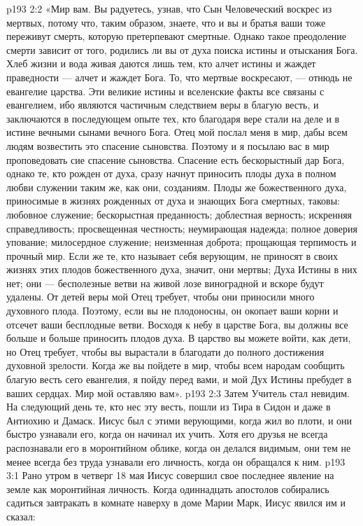 \vs p193 2:2 \pc «Мир вам. Вы радуетесь, узнав, что Сын Человеческий воскрес из мертвых, потому что, таким образом, знаете, что и вы и братья ваши тоже переживут смерть, которую претерпевают смертные. Однако такое преодоление смерти зависит от того, родились ли вы от духа поиска истины и отыскания Бога. Хлеб жизни и вода живая даются лишь тем, кто алчет истины и жаждет праведности --- алчет и жаждет Бога. То, что мертвые воскресают, --- отнюдь не евангелие царства. Эти великие истины и вселенские факты все связаны с евангелием, ибо являются частичным следствием веры в благую весть, и заключаются в последующем опыте тех, кто благодаря вере стали на деле и в истине вечными сынами вечного Бога. Отец мой послал меня в мир, дабы всем людям возвестить это спасение сыновства. Поэтому и я посылаю вас в мир проповедовать сие спасение сыновства. Спасение есть бескорыстный дар Бога, однако те, кто рожден от духа, сразу начнут приносить плоды духа в полном любви служении таким же, как они, созданиям. Плоды же божественного духа, приносимые в жизнях рожденных от духа и знающих Бога смертных, таковы: любовное служение; бескорыстная преданность; доблестная верность; искренняя справедливость; просвещенная честность; неумирающая надежда; полное доверия упование; милосердное служение; неизменная доброта; прощающая терпимость и прочный мир. Если же те, кто называет себя верующим, не приносят в своих жизнях этих плодов божественного духа, значит, они мертвы; Духа Истины в них нет; они --- бесполезные ветви на живой лозе виноградной и вскоре будут удалены. От детей веры мой Отец требует, чтобы они приносили много духовного плода. Поэтому, если вы не плодоносны, он окопает ваши корни и отсечет ваши бесплодные ветви. Восходя к небу в царстве Бога, вы должны все больше и больше приносить плодов духа. В царство вы можете войти, как дети, но Отец требует, чтобы вы вырастали в благодати до полного достижения духовной зрелости. Когда же вы пойдете в мир, чтобы всем народам сообщить благую весть сего евангелия, я пойду перед вами, и мой Дух Истины пребудет в ваших сердцах. Мир мой оставляю вам».
\vs p193 2:3 \pc Затем Учитель стал невидим. На следующий день те, кто нес эту весть, пошли из Тира в Сидон и даже в Антиохию и Дамаск. Иисус был с этими верующими, когда жил во плоти, и они быстро узнавали его, когда он начинал их учить. Хотя его друзья не всегда распознавали его в моронтийном облике, когда он делался видимым, они тем не менее всегда без труда узнавали его личность, когда он обращался к ним.
\vs p193 3:1 Рано утром в четверг 18 мая Иисус совершил свое последнее явление на земле как моронтийная личность. Когда одиннадцать апостолов собирались садиться завтракать в комнате наверху в доме Марии Марк, Иисус явился им и сказал:
